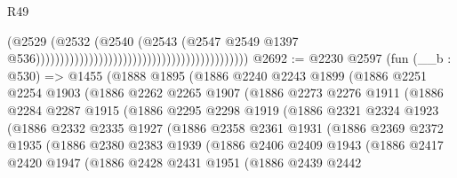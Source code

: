 \begin{lexlean}{R49}
\begin{coremodule}
                                                                                  (@2529
                                                                                    (@2532
                                                                                      (@2540
                                                                                        (@2543
                                                                                          (@2547
                                                                                            @2549
                                                                                            @1397
                                                                                            @536))))))))))))))))))))))))))))))))))))))))))))
@2692 := @2230
    @2597
    (fun (__b : @530) =>
    @1455
      (@1888
        @1895
        (@1886
          @2240
          @2243
          @1899
          (@1886
            @2251
            @2254
            @1903
            (@1886
              @2262
              @2265
              @1907
              (@1886
                @2273
                @2276
                @1911
                (@1886
                  @2284
                  @2287
                  @1915
                  (@1886
                    @2295
                    @2298
                    @1919
                    (@1886
                      @2321
                      @2324
                      @1923
                      (@1886
                        @2332
                        @2335
                        @1927
                        (@1886
                          @2358
                          @2361
                          @1931
                          (@1886
                            @2369
                            @2372
                            @1935
                            (@1886
                              @2380
                              @2383
                              @1939
                              (@1886
                                @2406
                                @2409
                                @1943
                                (@1886
                                  @2417
                                  @2420
                                  @1947
                                  (@1886
                                    @2428
                                    @2431
                                    @1951
                                    (@1886
                                      @2439
                                      @2442

\end{coremodule}
\end{lexlean}
